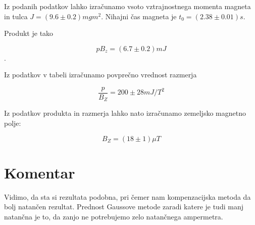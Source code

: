 \documentclass[12pt]{report}
\begin{document}
Iz podanih podatkov lahko izračunamo vsoto vztrajnostnega momenta magneta in tulca $J = (9.6 \pm 0.2) mgm^2$. Nihajni čas magneta je $t_0 = (2.38 \pm 0.01) s$. 

Produkt je tako 

\[ pB_z = (6.7 \pm 0.2) mJ\]. 

Iz podatkov v tabeli izračunamo povprečno vrednost razmerja 

\[ \frac{p}{B_Z} = 200 \pm 28mJ/T^2\]

Iz podatkov produkta in razmerja lahko nato izračunamo zemeljsko magnetno polje: 

\[ B_Z = (18 \pm 1) \mu T\]

\chapter*{Komentar}

Vidimo, da sta si rezultata podobna, pri čemer nam kompenzacijska metoda da bolj natančen rezultat. Prednost Gaussove metode zaradi katere je tudi manj natančna je to, da zanjo ne potrebujemo zelo natančnega ampermetra. 
\end{document}
